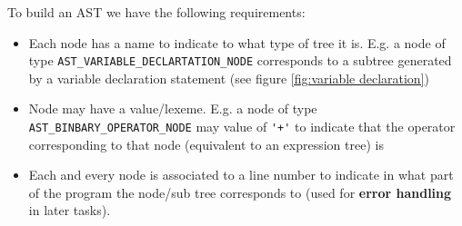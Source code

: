 To build an AST we have the following requirements:
\begin{itemize}
    \item Each node has a name to indicate to what type of tree it is. E.g. a node of type 
    \verb!AST_VARIABLE_DECLARTATION_NODE! corresponds to a subtree generated by a variable declaration statement (see figure \ref{fig:variable declaration})
    \item Node may have a value/lexeme. E.g. a node of type  \verb!AST_BINBARY_OPERATOR_NODE! may value of \verb!'+'! to indicate that the operator corresponding to that node (equivalent to an expression tree) is 
    \item Each and every node is associated to a line number to indicate in what part of the program the node/sub tree  corresponds to (used for \textbf{error handling} in later tasks).
\end{itemize}

